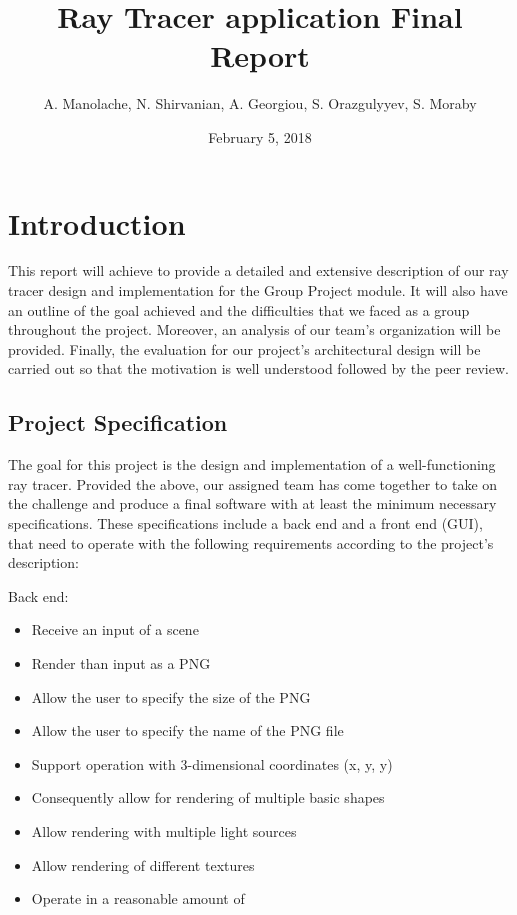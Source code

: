 \documentclass[11pt,a4paper]{article}
\title{Ray Tracer application Final Report}
\author{A. Manolache, N. Shirvanian, A. Georgiou, S. Orazgulyyev, S. Moraby}
\date{February 5, 2018}
\begin{document}
\maketitle

\section{Introduction}

This report will achieve to provide a detailed and extensive description of our ray tracer design and implementation for the Group Project module. It will also have an outline of the goal achieved and the difficulties that we faced as a group throughout the project. Moreover, an analysis of our team's organization will be provided. Finally, the evaluation for our project's architectural design will be carried out so that the motivation is well understood followed by the peer review. 

\subsection{Project Specification}

The goal for this project is the design and implementation of a well-functioning ray tracer. Provided the above, our assigned team has come together to take on the challenge and produce a final software with at least the minimum necessary specifications. 
These specifications include a back end and a front end (GUI), that need to operate with the following requirements according to the project’s description: 

Back end:
\begin{itemize}[nosep, wide=20pt, leftmargin=*, after=\strut]
    \item Receive an input of a scene 
    \item Render than input as a PNG
    \item Allow the user to specify the size of the PNG
    \item Allow the user to specify the name of the PNG file
    \item Support operation with 3-dimensional coordinates (x, y, y)
    \item Consequently allow for rendering of multiple basic shapes
    \item Allow rendering with multiple light sources 
    \item Allow rendering of different textures 
    \item Operate in a reasonable amount of 
\end{itemize}
\end{document}
